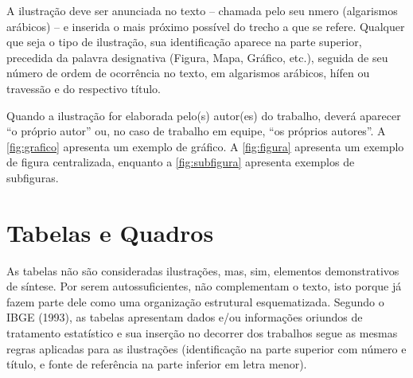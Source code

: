 \documentclass[12pt,oneside,a4paper,chapter=TITLE,section=TITLE,sumario
=tradicional]{abntex2}
\begin{document}
A ilustração deve ser anunciada no texto – chamada pelo seu nmero (algarismos 
arábicos) – e inserida o mais próximo possível do trecho a que se refere.
Qualquer que seja o tipo de ilustração, sua identificação aparece na parte 
superior, precedida da palavra designativa (Figura, Mapa, Gráfico, etc.), 
seguida de seu número de ordem de ocorrência no texto, em algarismos arábicos, 
hífen ou travessão e do respectivo título.

Quando a ilustração for elaborada pelo(s) autor(es) do trabalho, deverá 
aparecer ``o próprio autor'' ou, no caso de trabalho em equipe, ``os próprios 
autores''. A \autoref{fig:grafico} apresenta um exemplo de gráfico. A 
\autoref{fig:figura} apresenta um exemplo de figura centralizada, enquanto a 
\autoref{fig:subfigura} apresenta exemplos de subfiguras.

\begin{grafico}[htb]
\end{grafico}

\begin{figure}[htb]
\end{figure}

\begin{figure}[htb]
    \hfil
    \hfil
    
    \hfil
    \hfil
    
\end{figure}

\section{Tabelas e Quadros}
\label{sec:tabelas}

As tabelas não são consideradas ilustrações, mas, sim, elementos demonstrativos 
de síntese. Por serem autossuficientes, não complementam o texto, isto porque 
já fazem parte dele como uma organização estrutural esquematizada. Segundo o 
IBGE (1993), as tabelas apresentam dados e/ou informações oriundos de 
tratamento estatístico e sua inserção no decorrer dos trabalhos segue as mesmas 
regras aplicadas para as ilustrações (identificação na parte superior com 
número e título, e fonte de referência na parte inferior em letra menor).
\end{document}
